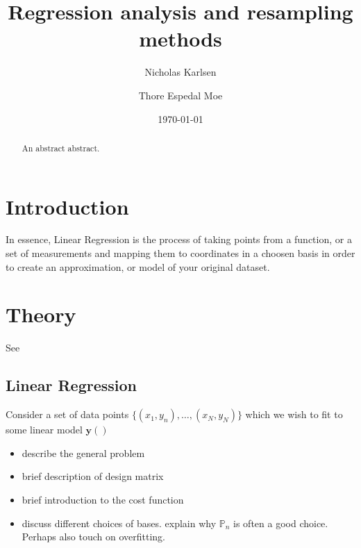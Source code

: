 \documentclass[reprint, english, nofootinbib]{revtex4-2}
\begin{document}
\title{Regression analysis and resampling methods}
\author{Nicholas Karlsen}
\author{Thore Espedal Moe}
\date{\today}

\begin{abstract}
    An abstract abstract.
\end{abstract}

\maketitle

\section{Introduction}
    \noindent
    In essence, Linear Regression is the process of taking points from a function, or a set of measurements and mapping them to coordinates in a choosen basis in order to create an approximation, or model of your original dataset.
\section{Theory}
    See \textcite{hastie}
    \subsection{Linear Regression}
        Consider a set of data points $\{(x_1, y_n), \dots, (x_N, y_N)\}$ which we wish to fit to some linear model $\mathbf y()$
        \begin{itemize}
            \item describe the general problem
            \item brief description of design matrix
            \item brief introduction to the cost function
            \item discuss different choices of bases. explain why $\mathbb P_n$ is often a good choice. Perhaps also touch on overfitting.
        \end{itemize}
\end{document}
